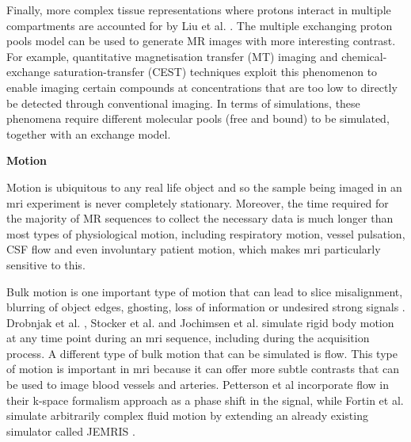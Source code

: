 \hfill

Finally, more complex tissue representations where protons interact in multiple compartments are accounted for by Liu et al. \cite{Liu2017}. 
The multiple exchanging proton pools model can be used to generate MR images with more interesting contrast.
For example, quantitative magnetisation transfer (MT) imaging and chemical-exchange saturation-transfer (CEST) techniques exploit this phenomenon to enable imaging certain compounds at concentrations that are too low to directly be detected through conventional imaging.
In terms of simulations, these phenomena require different molecular pools (free and bound) to be simulated, together with an exchange model.


\hfill

\large \textbf{Motion} \normalsize

Motion is ubiquitous to any real life object and so the sample being imaged in an \ac{mri} experiment is never completely stationary.
Moreover, the time required for the majority of MR sequences to collect the necessary data is much longer than most types of physiological motion, including respiratory motion, vessel pulsation, CSF flow and even involuntary patient motion, which makes \ac{mri} particularly sensitive to this.

\hfill

Bulk motion is one important type of motion that can lead to slice misalignment, blurring of object edges, ghosting, loss of information or undesired strong signals \cite{Zaitsev2015}.
Drobnjak et al. \cite{Drobnjak2006}, Stocker et al. \cite{Stocker2010} and Jochimsen et al. \cite{Jochimsen2004} simulate rigid body motion at any time point during an \ac{mri} sequence, including during the acquisition process.
A different type of bulk motion that can be simulated is flow.
This type of motion is important in \ac{mri} because it can offer more subtle contrasts that can be used to image blood vessels and arteries.
Petterson et al \cite{Petersson1993} incorporate flow in their k-space formalism approach as a phase shift in the signal, while 
Fortin et al. \cite{Fortin2016} simulate arbitrarily complex fluid motion by extending an already existing simulator called JEMRIS \cite{Stocker2010}.

